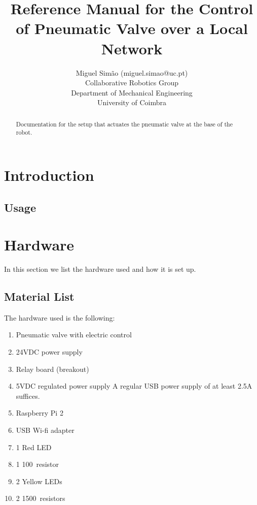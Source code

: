 \documentclass[twoside,a4paper]{refart}
\author{Miguel Sim\~ao (miguel.simao@uc.pt) \\
		Collaborative Robotics Group \\
		Department of Mechanical Engineering \\
		University of Coimbra}
\title{Reference Manual for the Control of Pneumatic Valve over a Local Network}
\date{}
\begin{document}
	
\maketitle


\begin{abstract}
	Documentation for the setup that actuates the pneumatic valve at the base of the robot.
\end{abstract}

\tableofcontents

\newpage

\glsaddall
\printglossary[type=\acronymtype,title=Acronyms]




\section{Introduction}
\subsection{Usage}

\section{Hardware}
In this section we list the hardware used and how it is set up.

\subsection{Material List}

The hardware used is the following:
\begin{enumerate}
	
\item
Pneumatic valve with electric control
\item
24VDC power supply
\item
Relay board (breakout)
\item
5VDC regulated power supply
A regular USB power supply of at least 2.5A suffices. 
\item
Raspberry Pi 2
\item
USB Wi-fi adapter
\item
1 Red LED
\item
1 100\Omega \ resistor
\item
2 Yellow LEDs
\item
2 1500\Omega \ resistors
	
\end{enumerate}
\end{document}

